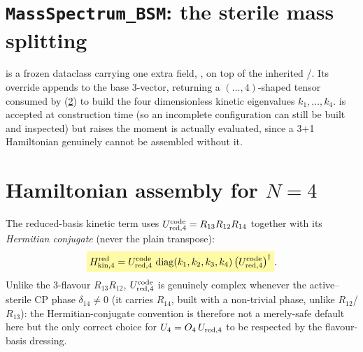 \section{\texttt{MassSpectrum\_BSM}: the sterile mass splitting}


\begin{implbox}
 is a frozen dataclass carrying one extra field,
, on top of the inherited /.
Its  override appends  to the
base 3-vector, returning a $(\dots,4)$-shaped tensor consumed by
 (\cref{sec:impl-kinetic}) to build the
four dimensionless kinetic eigenvalues $k_1,\dots,k_4$. 
is accepted at construction time (so an incomplete configuration can still
be built and inspected) but raises  the moment
 is actually evaluated, since a 3+1 Hamiltonian
genuinely cannot be assembled without it.
\end{implbox}

\section{Hamiltonian assembly for $N=4$}
\label{sec:impl-kinetic}


\begin{theorybox}
The reduced-basis kinetic term uses $U_{\rm red,4}^{\rm code}=R_{13}R_{12}R_{14}$
together with its \emph{Hermitian conjugate} (never the plain transpose):
\begin{equation}
  \keyresult{H_{\rm kin,4}^{\rm red} = U_{\rm red,4}^{\rm code}\,\diag(k_1,k_2,k_3,k_4)\,\bigl(U_{\rm red,4}^{\rm code}\bigr)^\dagger}.
\end{equation}
Unlike the 3-flavour $R_{13}R_{12}$, $U_{\rm red,4}^{\rm code}$ is
genuinely complex whenever the active--sterile CP phase $\delta_{14}\neq0$
(it carries $R_{14}$, built with a non-trivial phase, unlike
$R_{12}$/$R_{13}$): the Hermitian-conjugate convention is therefore not a
merely-safe default here but the only correct choice for
$U_4=O_4\,U_{\rm red,4}$ to be respected by the flavour-basis dressing.
\end{theorybox}

